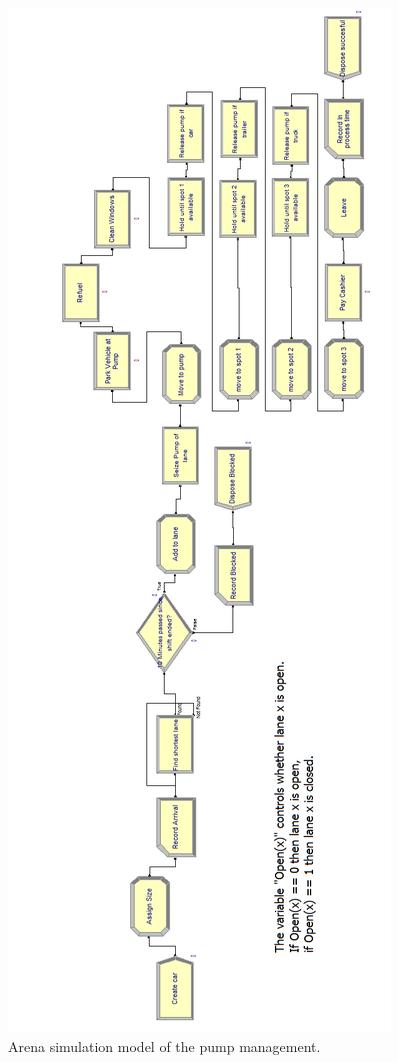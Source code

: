 \begin{figure}[!ht]
\begin{center}
	\includegraphics[scale=0.3]{images/model-description/model-pump-management.PNG}
	\caption{Arena simulation model of the pump management.}
	\label{fig:modelpumps}
\end{center}
\end{figure}